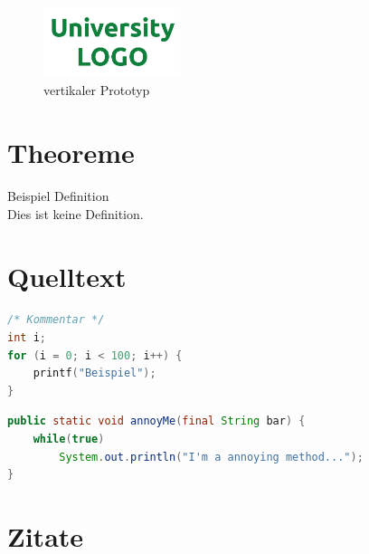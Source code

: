 \begin{figure}
	\vspace{-1em}
	\begin{center}
		\includegraphics[width=4cm]{img/unilogo.png}
	\end{center}
	\vspace{-1em}
	\caption{vertikaler Prototyp}
	\label{fig:vertikaler_prototyping}
	\vspace{-1em}
\end{figure}

\blindtext

\section{Theoreme}
\blindtext

\begin{definition}{Beispiel Definition}
\\
Dies ist keine Definition.
\end{definition}

\blindtext

\section{Quelltext}
\blindtext

\vspace{1em}
\begin{lstlisting}[language=C,caption={Beispielquelltext}, label=lst:beispiel]
/* Kommentar */
int i;
for (i = 0; i < 100; i++) {
	printf("Beispiel");
}
\end{lstlisting}

\vspace{1em}
\begin{lstlisting}[language=java,caption={Beispielquelltext 2}, label=lst:beispiel2]
public static void annoyMe(final String bar) {
	while(true)
		System.out.println("I'm a annoying method...");
}
\end{lstlisting}

\section{Zitate}

\begin{itemize*}
	\item {}
	\item {}
	\item {}
	\item {}
	\item {}
	\item {}
	\item {}
	\item {}
\end{itemize*}
